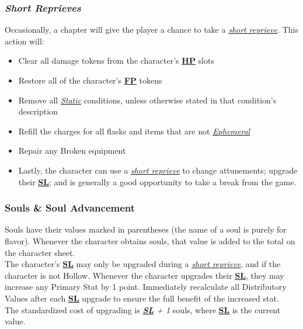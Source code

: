 \documentclass[12pt]{article}
\newcommand{\refto}[1]{\hyperlink{#1}{\textbf{#1}}}
\newcommand{\reftoit}[1]{\hyperlink{#1}{\emph{#1}}}
\begin{document}
\begin{multicols*}{2}
\subsubsection{\emph{Short Reprieves}}
\hypertarget{short reprieve}{}\hypertarget{short reprieves}{}
Occasionally, a chapter will give the player a chance to take a \reftoit{short reprieve}. This action will:
\begin{itemize}
\item Clear all damage tokens from the character’s \refto{HP} slots
\item Restore all of the character’s \refto{FP} tokens
\item Remove all \reftoit{Static} conditions, unless otherwise stated in that condition’s description
\item Refill the charges for all flasks and items that are not \reftoit{Ephemeral}
\item Repair any Broken equipment
\item Lastly, the character can use a \reftoit{short reprieve} to change attunements; upgrade their \refto{SL}; and is generally a good opportunity to take a break from the game.
\end{itemize}

\subsubsection{Souls \& Soul Advancement}
Souls have their values marked in parentheses (the name of a soul is purely for flavor). Whenever the character obtains souls, that value is added to the total on the character sheet. \\
The character’s \refto{SL} may only be upgraded during a \reftoit{short reprieve}, and if the character is not Hollow. Whenever the character upgrades their \refto{SL}, they may increase any Primary Stat by 1 point. Immediately recalculate all Distributory Values after each \refto{SL} upgrade to ensure the full benefit of the increased stat.\\
The standardized cost of upgrading is \emph{\refto{SL} + 1} souls, where \refto{SL} is the current value.


\end{multicols*}
\end{document}
